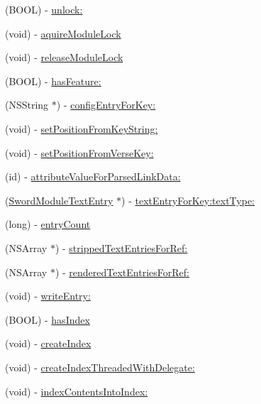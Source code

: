 \begin{DoxyCompactItemize}
\item 
(B\-O\-O\-L) -\/ \hyperlink{interface_sword_module_a1ce0d4f7681d6073c3e32cd97bedfe1c}{unlock\-:}
\item 
(void) -\/ \hyperlink{interface_sword_module_aa7102d452cc68b75ef5ee5a3f7fb2467}{aquire\-Module\-Lock}
\item 
(void) -\/ \hyperlink{interface_sword_module_aea71bd5671add694c914b764806ecb77}{release\-Module\-Lock}
\item 
(B\-O\-O\-L) -\/ \hyperlink{interface_sword_module_a396c0303270a24b89836a65cd0c5b84a}{has\-Feature\-:}
\item 
(N\-S\-String $\ast$) -\/ \hyperlink{interface_sword_module_a2041c1236ea280b9764c69a5cc66fed5}{config\-Entry\-For\-Key\-:}
\item 
(void) -\/ \hyperlink{interface_sword_module_a0394b3637e7dae37f772dae419f1d552}{set\-Position\-From\-Key\-String\-:}
\item 
(void) -\/ \hyperlink{interface_sword_module_a82a57b6dfd02a6ed95d0bda509ae757b}{set\-Position\-From\-Verse\-Key\-:}
\item 
(id) -\/ \hyperlink{interface_sword_module_acadfeed535fa998343149e7bd33bb9d3}{attribute\-Value\-For\-Parsed\-Link\-Data\-:}
\item 
(\hyperlink{interface_sword_module_text_entry}{Sword\-Module\-Text\-Entry} $\ast$) -\/ \hyperlink{interface_sword_module_acb8ace921739306c4e8b0ac96cc0b172}{text\-Entry\-For\-Key\-:text\-Type\-:}
\item 
(long) -\/ \hyperlink{interface_sword_module_abee894396dd4355fb4d0a1c613f028c5}{entry\-Count}
\item 
(N\-S\-Array $\ast$) -\/ \hyperlink{interface_sword_module_a7f841144cca13041d14f64f8fc2e14f2}{stripped\-Text\-Entries\-For\-Ref\-:}
\item 
(N\-S\-Array $\ast$) -\/ \hyperlink{interface_sword_module_a3f1c8e8237f4055fdc0b431d83bd35e0}{rendered\-Text\-Entries\-For\-Ref\-:}
\item 
(void) -\/ \hyperlink{interface_sword_module_af12cda3e69ebf7baffa24da55fdf82d1}{write\-Entry\-:}
\item 
(B\-O\-O\-L) -\/ \hyperlink{interface_sword_module_a726d42d0c52fe9804e02eba26ce34544}{has\-Index}
\item 
(void) -\/ \hyperlink{interface_sword_module_a23ece6525a46de8cd6ecea85d509c137}{create\-Index}
\item 
(void) -\/ \hyperlink{interface_sword_module_a5b9ad4c4b82328c7da6a5d34f07e2691}{create\-Index\-Threaded\-With\-Delegate\-:}
\item 
(void) -\/ \hyperlink{interface_sword_module_ac27de8546781130724ef5aed32a4ec13}{index\-Contents\-Into\-Index\-:}
\end{DoxyCompactItemize}
